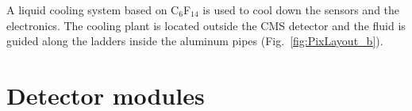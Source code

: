 A liquid cooling system based on C$_6$F$_{14}$ is used to cool down the sensors and the electronics.
The cooling plant is located outside the CMS detector and the fluid is guided along the ladders inside the aluminum pipes (Fig.~\ref{fig:PixLayout_b}).

\section{Detector modules}\label{sec:BPix_modules}

